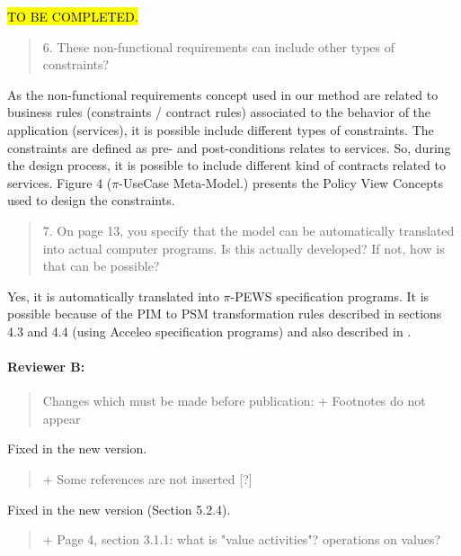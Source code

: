 \documentclass[12pt,a4wide]{article}
\begin{document}
\noindent 
\hl{TO BE COMPLETED.}

\begin{quotation}\sf\footnotesize

6.	These non-functional requirements can include other types of constraints? 
\end{quotation}

\noindent 
As the non-functional requirements concept used in our method are related to business rules (constraints / contract rules) associated to the behavior of the application (services), it is possible include different types of constraints. The constraints are defined as pre- and post-conditions relates to services. So, during the design process, it is possible to include different kind of contracts related to services.  Figure 4 ($\pi$-UseCase Meta-Model.) presents the Policy View Concepts used to design the constraints.

\begin{quotation}\sf\footnotesize

7.	On page 13, you specify that the model can be automatically translated into actual computer programs. Is this actually developed? If not, how is that can be possible? 
\end{quotation}
 
\noindent 
Yes, it is automatically translated into $\pi$-PEWS \cite{MPC08,BaCAM05,BHM06,BHM06rep} specification programs. It is possible because of the PIM to PSM transformation rules described in sections 4.3 and 4.4 (using Acceleo specification programs) and also described in \cite{placidoPhDThesis2012}.
 
 
\paragraph*{Reviewer B:} 
\begin{quotation}\sf\footnotesize

Changes which must be made before publication: 
+ Footnotes do not appear 
\end{quotation}

\noindent 
Fixed in the new version.


\begin{quotation}\sf\footnotesize

+ Some references are not inserted [?] 
\end{quotation}

\noindent 
Fixed in the new version (Section 5.2.4).

\begin{quotation}\sf\footnotesize

+ Page 4, section 3.1.1: what is "value activities"? operations on values? 
\end{quotation}
\end{document}

